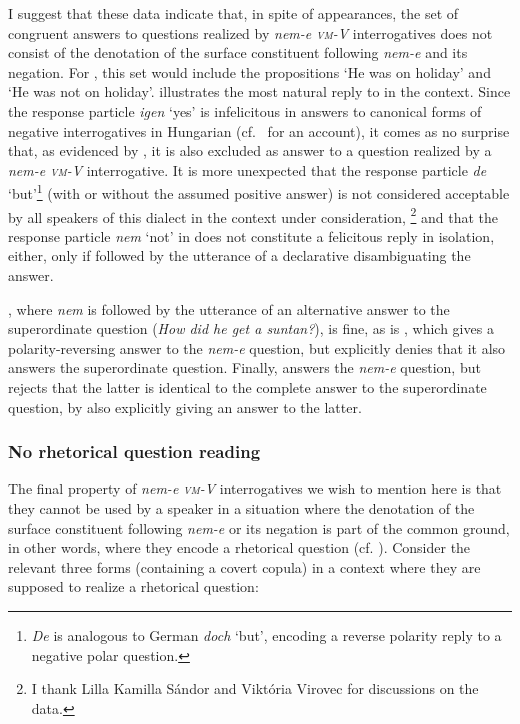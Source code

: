 \documentclass[output=paper,colorlinks,citecolor=brown]{langscibook}
\begin{document}
	\noindent I suggest that these data indicate that, in spite of appearances, the set of congruent answers to questions realized by \textit{nem-e \textsc{vm}-V} interrogatives does not consist of 
	the denotation of the surface constituent following \textit{nem-e} and its negation. For , this set would include the propositions `He was on holiday' and `He was not on holiday'.  illustrates the most natural reply to  in the context. 
	Since the response particle \textit{igen} `yes' is infelicitous in answers to canonical forms of negative interrogatives in Hungarian (cf.~\citealt{farkas2009} for an account), it comes as no surprise that, as evidenced by ,  it is also excluded as answer to a question realized by a \textit{nem-e \textsc{vm}-V} interrogative. It is more unexpected  that  the response particle \textit{de} `but'\footnote{\textit{De} is analogous to German \textit{doch} `but', encoding a reverse polarity reply to a negative polar question.} (with or without the assumed positive answer) is not considered acceptable by all speakers of this dialect in the context under consideration, \footnote{I thank Lilla Kamilla Sándor and Viktória Virovec for discussions on the data.} and that the response particle \textit{nem} `not' in  does not constitute a felicitous reply in isolation, either, only if followed by the utterance of a declarative disambiguating the answer. 

	, where \textit{nem} is followed by the utterance of an alternative answer to the superordinate question (\textit{How did he get a suntan?}), is fine, as is , which gives a polarity-reversing answer to the \textit{nem-e} question, but explicitly denies that it also answers the superordinate question. Finally,  answers the \textit{nem-e} question, but rejects that the latter is identical to the complete answer to the superordinate question, by also explicitly giving an answer to the latter. 
	
	
\subsubsection{No rhetorical question reading}\label{sect:no_add_comp}

	
	The final property of \textit{nem-e \textsc{vm}-V} interrogatives we wish to mention here is that they cannot be used by a speaker in a situation where the denotation of the surface constituent following \textit{nem-e} or its negation is part of the common ground, in other words, where they encode a rhetorical question (cf. \citealt{caponigro+sprouse}). Consider the relevant three forms (containing a covert copula) in a context where they are supposed to realize a rhetorical question:
	
\end{document}
